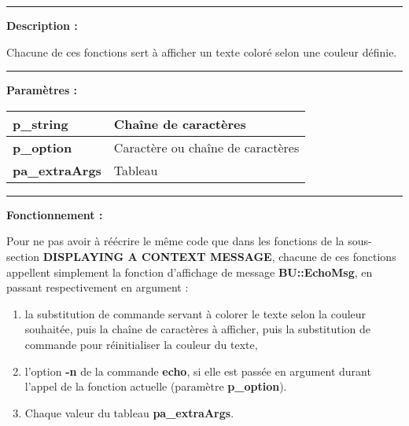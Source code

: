 \documentclass[a4paper,10pt]{article}
\begin{document}

\par\noindent\rule{\textwidth}{0.4pt}

\begin{justify}
    \textbf{Description :}

    Chacune de ces fonctions sert à afficher un texte coloré selon une couleur définie.
\end{justify}


\par\noindent\rule{\textwidth}{0.4pt}

\begin{justify}
    \textbf{Paramètres :}

    \begin{tabular}{|l|l|}
        \hline
        \textbf{\color{vars}p\_string} & Chaîne de caractères\\
        \hline
        \textbf{\color{vars}p\_option} & Caractère ou chaîne de caractères\\
        \hline
        \textbf{\color{vars}pa\_extraArgs} & Tableau\\
        \hline
    \end{tabular}
\end{justify}


\par\noindent\rule{\textwidth}{0.4pt}

\begin{justify}
    \textbf{Fonctionnement :}

    Pour ne pas avoir à réécrire le même code que dans les fonctions de la sous-section \textbf{\color{sec2}DISPLAYING A CONTEXT MESSAGE}, chacune de ces fonctions appellent simplement la fonction d'affichage de message \textbf{\color{func}BU::EchoMsg}, en passant respectivement en argument :
    \begin{enumerate}
        \item la substitution de commande servant à colorer le texte selon la couleur souhaitée, puis la chaîne de caractères à afficher, puis la substitution de commande pour réinitialiser la couleur du texte,
        \item l'option \textbf{\color{cmds}-n} de la commande \textbf{\color{cmds}echo}, si elle est passée en argument durant l'appel de la fonction actuelle (paramètre \textbf{\color{vars}p\_option}).
        \item Chaque valeur du tableau \textbf{\color{vars}pa\_extraArgs}.
    \end{enumerate}
\end{justify}
\end{document}
